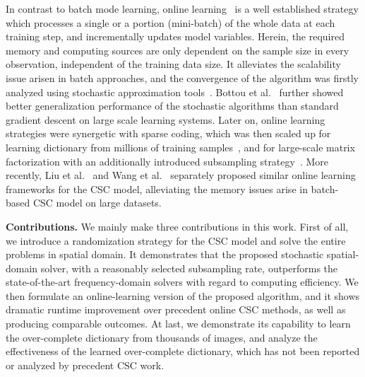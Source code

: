 In contrast to batch mode learning, online learning~\cite{shalev2012online} is a well established strategy which processes a single or a portion (mini-batch) of the whole data at each training step, and incrementally updates model variables. Herein, the required memory and computing sources are only dependent on the sample size in every observation, independent of the training data size. It alleviates the scalability issue arisen in batch approaches, and the convergence of the algorithm was firstly analyzed using stochastic approximation tools~\cite{bottou1998online}. Bottou et al.~\cite{bousquet2008tradeoffs} further showed better generalization performance of the stochastic algorithms than standard gradient descent on large scale learning systems. Later on, online learning strategies were synergetic with sparse coding, which was then scaled up for learning dictionary from millions of training samples~\cite{mairal2009online,mairal2010online}, and for large-scale matrix factorization with an additionally introduced subsampling strategy~\cite{mensch2016dictionary}. More recently, Liu et al.~\cite{liu-2018-first} and Wang et al.~\cite{wang2018scalable} separately proposed similar online learning frameworks for the CSC model, alleviating the memory issues arise in batch-based CSC model on large datasets.

{\bfseries Contributions.} We mainly make three contributions in this work. First of all, we introduce a randomization strategy for the CSC model and solve the entire problems in spatial domain. It demonstrates that the proposed stochastic spatial-domain solver, with a reasonably selected subsampling rate, outperforms the state-of-the-art frequency-domain solvers with regard to computing efficiency. We then formulate an online-learning version of the proposed algorithm, and it shows dramatic runtime improvement over precedent online CSC methods, as well as producing comparable outcomes. At last, we demonstrate its capability to learn the over-complete dictionary from thousands of images, and analyze the effectiveness of the learned over-complete dictionary, which has not been reported or analyzed by precedent CSC work. 